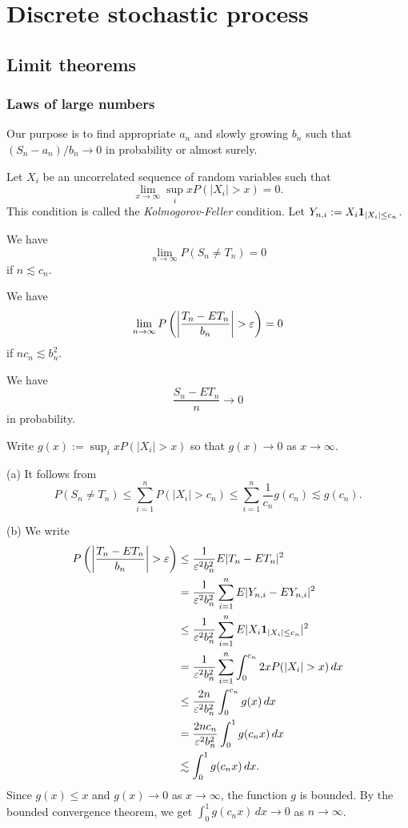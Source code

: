 \documentclass{../../large}
\begin{document}
\part{Discrete stochastic process}


\chapter{Limit theorems}

\section{Laws of large numbers}


Our purpose is to find appropriate $a_n$ and slowly growing $b_n$ such that $(S_n-a_n)/b_n\to0$ in probability or almost surely.


\begin{prb}
Let $X_i$ be an uncorrelated sequence of random variables such that
\[\lim_{x\to\infty}\sup_ixP(|X_i|>x)=0.\]
This condition is called the \emph{Kolmogorov-Feller} condition.
Let $Y_{n,i}:=X_i\mathbf{1}_{|X_i|\le c_n}$.
\begin{parts}
\item We have
\[\lim_{n\to\infty}P(S_n\ne T_n)=0\]
if $n\lesssim c_n$.
\item We have
\[\lim_{n\to\infty}P\left(\left|\frac{T_n-ET_n}{b_n}\right|>\e\right)=0\]
if $nc_n\lesssim b_n^2$.
\item We have
\[\frac{S_n-ET_n}n\to0\]
in probability.
\end{parts}
\end{prb}
\begin{pf}
Write $g(x):=\sup_ixP(|X_i|>x)$ so that $g(x)\to0$ as $x\to\infty$.

(a)
It follows from
\[P(S_n\ne T_n)\le\sum_{i=1}^nP(|X_i|>c_n)\le\sum_{i=1}^n\frac1{c_n}g(c_n)\lesssim g(c_n).\]

(b)
We write
\begin{align*}
P\left(\left|\frac{T_n-ET_n}{b_n}\right|>\e\right)
&\le\frac1{\e^2b_n^2}E|T_n-ET_n|^2\\
&=\frac1{\e^2b_n^2}\sum_{i=1}^nE|Y_{n,i}-EY_{n,i}|^2\\
&\le\frac1{\e^2b_n^2}\sum_{i=1}^nE|X_i\1_{|X_i|\le c_n}|^2\\
&=\frac1{\e^2b_n^2}\sum_{i=1}^n\int_0^{c_n}2xP(|X_i|>x)\,dx\\
&\le\frac{2n}{\e^2b_n^2}\int_0^{c_n}g(x)\,dx\\
&=\frac{2nc_n}{\e^2b_n^2}\int_0^1g(c_nx)\,dx\\
&\lesssim\int_0^1g(c_nx)\,dx.
\end{align*}
Since $g(x)\le x$ and $g(x)\to0$ as $x\to\infty$, the function $g$ is bounded.
By the bounded convergence theorem, we get $\int_0^1g(c_nx)\,dx\to0$ as $n\to\infty$.
\end{pf}
\end{document}
